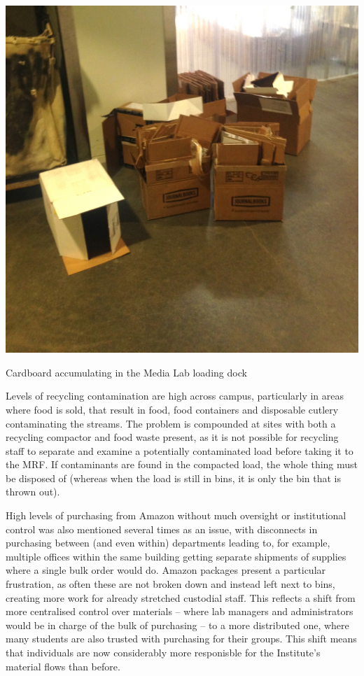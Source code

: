 \documentclass[nofonts,nols,justified,nobib]{tufte-book}
\begin{document}
\begin{marginfigure}
  \includegraphics[width=1\linewidth]{img/2/mit-bins/loading1.JPG}
  \caption{Cardboard accumulating in the Media Lab loading dock}
\end{marginfigure}


Levels of recycling contamination are high across campus, particularly in areas where food is sold, that result in food, food containers and disposable cutlery contaminating the streams. The problem is compounded at sites with both a recycling compactor and food waste present, as it is not possible for recycling staff to separate and examine a potentially contaminated load before taking it to the MRF. If contaminants are found in the compacted load, the whole thing must be disposed of (whereas when the load is still in bins, it is only the bin that is thrown out).

High levels of purchasing from Amazon without much oversight or institutional control was also mentioned several times as an issue, with disconnects in purchasing between (and even within) departments leading to, for example, multiple offices within the same building getting separate shipments of supplies where a single bulk order would do. Amazon packages present a particular frustration, as often these are not broken down and instead left next to bins, creating more work for already stretched custodial staff. This reflects a shift from more centralised control over materials -- where lab managers and administrators would be in charge of the bulk of purchasing -- to a more distributed one, where many students are also trusted with purchasing for their groups. This shift means that individuals are now considerably more responisble for the Institute's material flows than before.
\end{document}
